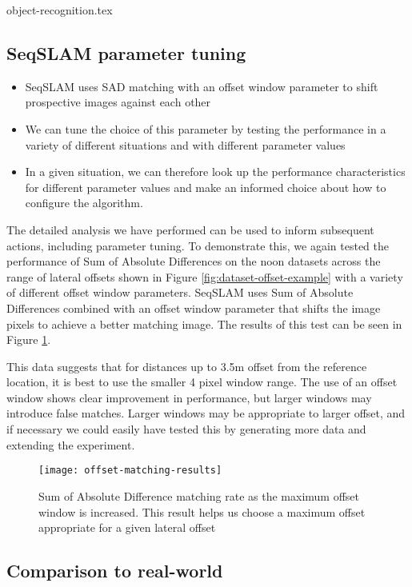 \documentclass[letterpaper, 10 pt, conference]{ieeeconf}  %
\begin{document}
{object-recognition.tex}

\subsection{SeqSLAM parameter tuning}

\begin{itemize}
    \item SeqSLAM uses SAD matching with an offset window parameter to shift prospective images against each other
    \item We can tune the choice of this parameter by testing the performance in a variety of different situations and with different parameter values
    \item In a given situation, we can therefore look up the performance characteristics for different parameter values and make an informed choice about how to configure the algorithm.
\end{itemize}

The detailed analysis we have performed can be used to inform subsequent actions, including parameter tuning. To demonstrate this, we again tested the performance of Sum of Absolute Differences on the noon datasets across the range of lateral offsets shown in Figure \ref{fig:dataset-offset-example} with a variety of different offset window parameters. SeqSLAM uses Sum of Absolute Differences combined with an offset window parameter that shifts the image pixels to achieve a better matching image. The results of this test can be seen in Figure \ref{fig:offset-matching-param-results}.

This data suggests that for distances up to 3.5m offset from the reference location, it is best to use the smaller 4 pixel window range. The use of an offset window shows clear improvement in performance, but larger windows may  introduce false matches. Larger windows may be appropriate to larger offset, and if necessary we could easily have tested this by generating more data and extending the experiment.

\begin{figure}[t]
    \texttt{[image: offset-matching-results]}
    \caption{Sum of Absolute Difference matching rate as the maximum offset window is increased. This result helps us choose a maximum offset appropriate for a given lateral offset}
    \label{fig:offset-matching-param-results}
\end{figure}

\subsection{Comparison to real-world}
\end{document}
